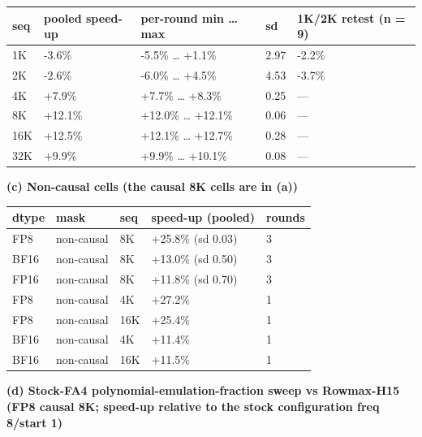 {\scriptsize
\setlength{\tabcolsep}{2pt}
\begin{longtable}{@{}lllll@{}}
\toprule
\textbf{seq} & \textbf{pooled speed-up} & \textbf{per-round min \ldots{} max} & \textbf{sd} & \textbf{1K/2K retest (n = 9)} \\
\midrule
\endhead
1K & -3.6\% & -5.5\% \ldots{} +1.1\% & 2.97 & -2.2\% \\
2K & -2.6\% & -6.0\% \ldots{} +4.5\% & 4.53 & -3.7\% \\
4K & +7.9\% & +7.7\% \ldots{} +8.3\% & 0.25 & --- \\
8K & +12.1\% & +12.0\% \ldots{} +12.1\% & 0.06 & --- \\
16K & +12.5\% & +12.1\% \ldots{} +12.7\% & 0.28 & --- \\
32K & +9.9\% & +9.9\% \ldots{} +10.1\% & 0.08 & --- \\
\bottomrule
\end{longtable}
\addtocounter{table}{-1}
}
\par{}\par
\par\smallskip\noindent\textbf{(c) Non-causal cells (the causal 8K cells are in (a))}\par\nopagebreak
{\scriptsize
\setlength{\tabcolsep}{2pt}
\begin{longtable}{@{}lllll@{}}
\toprule
\textbf{dtype} & \textbf{mask} & \textbf{seq} & \textbf{speed-up (pooled)} & \textbf{rounds} \\
\midrule
\endhead
FP8 & non-causal & 8K & +25.8\% (sd 0.03) & 3 \\
BF16 & non-causal & 8K & +13.0\% (sd 0.50) & 3 \\
FP16 & non-causal & 8K & +11.8\% (sd 0.70) & 3 \\
FP8 & non-causal & 4K & +27.2\% & 1 \\
FP8 & non-causal & 16K & +25.4\% & 1 \\
BF16 & non-causal & 4K & +11.4\% & 1 \\
BF16 & non-causal & 16K & +11.5\% & 1 \\
\bottomrule
\end{longtable}
\addtocounter{table}{-1}
}
\par\smallskip\noindent\textbf{(d) Stock-FA4 polynomial-emulation-fraction sweep vs Rowmax-H15 (FP8 causal 8K; speed-up relative to the stock configuration freq 8/start 1)}\par\nopagebreak
